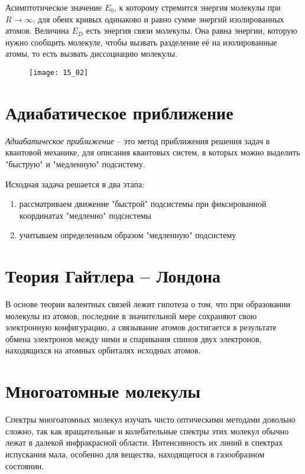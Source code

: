 Асимптотическое значение \( E_0 \), к которому стремится энергия 
молекулы при \( R \rightarrow \infty \), для обеих кривых одинаково 
и равно сумме энергий изолированных атомов. Величина \( E_D \) есть 
энергия связи молекулы. Она равна энергии, которую нужно сообщить 
молекуле, чтобы вызвать разделение её на изолированные атомы, то есть 
вызвать диссоциацию молекулы.

\begin{figure}[h!]
    \center
    \texttt{[image: 15\_02]}
\end{figure}

\section{Адиабатическое приближение}
\emph{Адиабатическое приближение} -- это метод приближения решения задач в 
квантовой механике, для описания квантовых систем, в которых можно выделить 
"быструю" и "медленную" подсистему. 

Исходная задача решается в два этапа:
\begin{enumerate}
    \item рассматриваем движение "быстрой" подсистемы при фиксированной 
        координатах "медленно" подсистемы
    \item учитываем определенным образом "медленную" подсистему
\end{enumerate}

\section{Теория Гайтлера -- Лондона}
В основе теории валентных связей лежит гипотеза о том, что при 
образовании молекулы из атомов, последние в значительной мере сохраняют 
свою электронную конфигурацию, а связывание атомов достигается в 
результате обмена электронов между ними и спаривания спинов двух 
электронов, находящихся на атомных орбиталях исходных атомов. 

\section{Многоатомные молекулы}
Спектры многоатомных молекул изучать чисто оптическими методами
довольно сложно, так как вращательные и колебательные спектры этих
молекул обычно лежат в далекой инфракрасной области. Интенсивность их
линий в спектрах испускания мала, особенно для вещества, находящегося в
газообразном состоянии.

